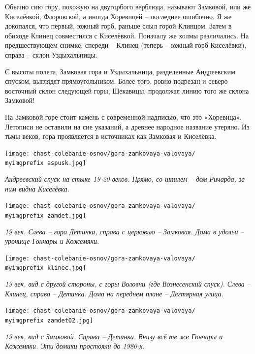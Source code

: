 Обычно сию гору, похожую на двугорбого верблюда, называют Замковой, или же Киселёвкой, Флоровской, а иногда Хоревицей – последнее ошибочно. Я же докопался, что первый, южный горб, раньше слыл горой Клинцом. Затем в обиходе Клинец совместился с Киселёвкой. Поначалу же холмы различались. На предшествующем снимке, спереди – Клинец (теперь – южный горб Киселёвки), справа – склон Уздыхальницы.

С высоты полета, Замковая гора и Уздыхальница, разделенные Андреевским спуском, выглядят прямоугольником. Более того, ровно подрезан и северо-восточный склон следующей горы, Щекавицы, продолжая линию того же склона Замковой!

На Замковой горе стоит камень с современной надписью, что это «Хоревица». Летописи не оставили на сие указаний, а древнее народное название утеряно. Из тьмы веков, гора проявляется в источниках как Замковая и Киселёвка.

\newpage
\vspace*{\fill}
\begin{center}
\texttt{[image: chast-colebanie-osnov/gora-zamkovaya-valovaya/\\myimgprefix aspusk.jpg]}

\textit{Андреевский спуск на стыке 19-20 веков. Прямо, со шпилем – дом Ричарда, за ним видна Киселёвка.}
\end{center}

\begin{center}
\texttt{[image: chast-colebanie-osnov/gora-zamkovaya-valovaya/\\myimgprefix zamdet.jpg]}

\textit{19 век. Слева – гора Детинка, справа с церковью – Замковая. Дома в удольи – урочище Гончары и Кожемяки.}
\end{center}
\vspace*{\fill}
\newpage

\vspace*{\fill}
\begin{center}
\texttt{[image: chast-colebanie-osnov/gora-zamkovaya-valovaya/\\myimgprefix klinec.jpg]}

\textit{19 век, вид с другой стороны, с горы Воловни (где Вознесенский спуск). Слева – Клинец, справа – Детинка. Дома на переднем плане – Дегтярная улица.}
\end{center}

\begin{center}
\texttt{[image: chast-colebanie-osnov/gora-zamkovaya-valovaya/\\myimgprefix zamdet02.jpg]}

\textit{19 век, вид с Замковой. Справа – Детинка. Внизу всё те же Гончары и Кожемяки. Эти домики простояли до 1980-х.}
\end{center}
\vspace*{\fill}
\newpage

